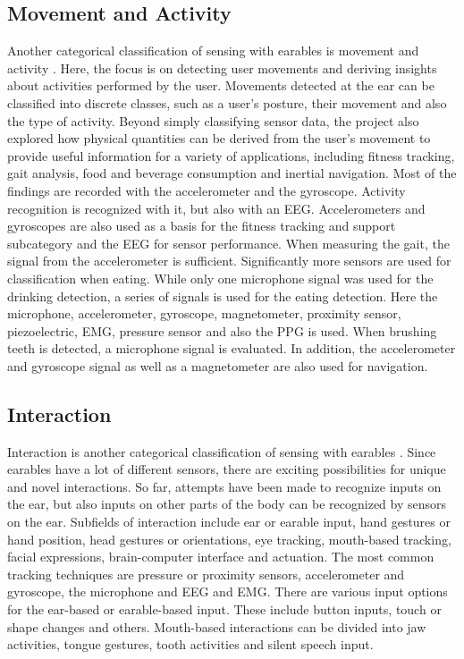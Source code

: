 \subsection{Movement and Activity}
\label{Background:SensingWithEarables:Movement}
Another categorical classification of sensing with earables is movement and activity \cite{roddigerSensingEarablesSystematic2022a}.
Here, the focus is on detecting user movements and deriving insights about activities performed by the user. 
Movements detected at the ear can be classified into discrete classes, such as a user's posture, their movement and also the type of activity. 
Beyond simply classifying sensor data, the project also explored how physical quantities can be derived from the user's movement to provide useful information for a variety of applications, including fitness tracking, gait analysis,
food and beverage consumption and inertial navigation.
Most of the findings are recorded with the accelerometer and the gyroscope.
Activity recognition is recognized with it, but also with an EEG. Accelerometers and gyroscopes are also used as a basis for the fitness tracking and support subcategory and the EEG for sensor performance.
When measuring the gait, the signal from the accelerometer is sufficient.
Significantly more sensors are used for classification when eating. While only one microphone signal was used for the drinking detection, a series of signals is used for the eating detection. 
Here the microphone, accelerometer, gyroscope, magnetometer, proximity sensor, piezoelectric, EMG, pressure sensor and also the PPG is used.
When brushing teeth is detected, a microphone signal is evaluated.
In addition, the accelerometer and gyroscope signal as well as a magnetometer are also used for navigation.

\subsection{Interaction}
\label{Background:SensingWithEarables:Interaction}
Interaction is another categorical classification of sensing with earables \cite{roddigerSensingEarablesSystematic2022a}.
Since earables have a lot of different sensors, there are exciting possibilities for unique and novel interactions.
So far, attempts have been made to recognize inputs on the ear, but also inputs on other parts of the body can be recognized by sensors on the ear.
Subfields of interaction include ear or earable input, hand gestures or hand position, head gestures or orientations, eye tracking, mouth-based tracking, facial expressions, brain-computer interface and actuation.
The most common tracking techniques are pressure or proximity sensors, accelerometer and gyroscope, the microphone and EEG and EMG.
There are various input options for the ear-based or earable-based input. 
These include button inputs, touch or shape changes and others.
Mouth-based interactions can be divided into jaw activities, tongue gestures, tooth activities and silent speech input.

